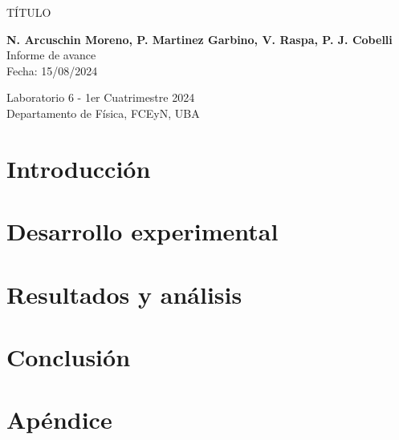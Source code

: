 \documentclass[]{article}
\begin{document}
\begin{center}																	
\vspace{1.5cm}
\textsc{\LARGE TÍTULO}\\[1cm]

\noindent\hrulefill 
\vspace{0.5cm}


{ \large \bfseries N. Arcuschin Moreno, P. Martinez Garbino, V. Raspa, P. J. Cobelli}
\vspace{0.1cm}
\vspace{0.2cm}
{
    Informe de avance \\
    Fecha: 15/08/2024
}
\vspace{0.2cm}

Laboratorio 6 - 1er Cuatrimestre 2024\\
Departamento de Física, FCEyN, UBA
\end{center}

\vspace{0.5cm}

\noindent\hrulefill 
\vspace{0.5cm}
\renewcommand{\tablename}{Tabla}
\setcounter{footnote}{0}

\begin{multicols}{2}
\noindent

\section{Introducción}



\section{Desarrollo experimental}



\section{Resultados y análisis}



\section{Conclusión}



\vspace{-0.5em}

\printbibliography

\section*{Apéndice}


\end{multicols}
\end{document}
